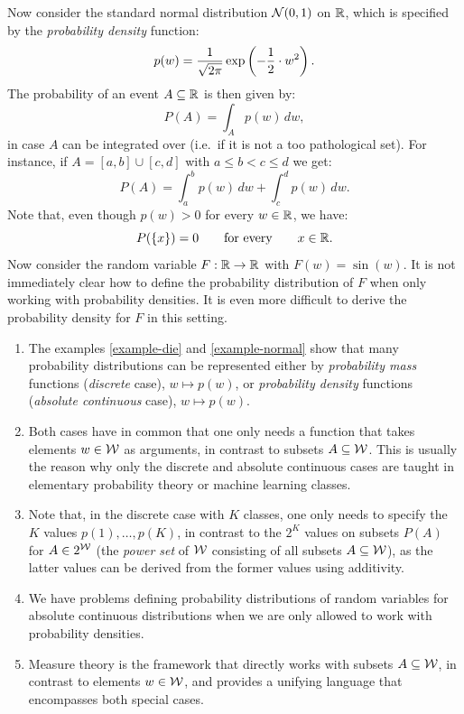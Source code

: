 \begin{Eg}%
    \label{example-normal}
    Now consider the standard normal distribution $\mathcal{N}(0,1)$ on $\mathbb{R}$, which is specified by the \emph{probability density} function:
    \[ p(w) = \frac{1}{\sqrt{2 \pi}} \exp\left ( - \frac{1}{2} \cdot w^2 \right ).   \]
    The probability of an event $A \subseteq \mathbb{R}$ is then given by:
    \[ P(A) = \int_A p(w) \, dw,\]
    in case $A$ can be integrated over (i.e.\ if it is not a too pathological set).
    For instance, if $A= [a,b] \cup [c,d]$ with $a \le b <c\le d$ we get:
    \[P(A) = \int_a^b p(w)\,dw + \int_c^d p(w)\,dw.\]
    Note that, even though $p(w) >0$ for every $w \in \mathbb{R}$, we have:
\[  P(\{x\}) = 0 \qquad \text{for every} \qquad  x \in \mathbb{R}.\]
Now consider the random variable $F: \mathbb{R} \to \mathbb{R}$ with $F(w)=\sin(w)$. 
It is not immediately clear how to define the probability distribution of $F$ when only working with probability densities. It is even more difficult to derive the probability density for $F$ in this setting.
\end{Eg}%

\begin{Disc}%
    \begin{enumerate}
        \item The examples \ref{example-die} and \ref{example-normal} show that many probability distributions can be represented either by \emph{probability mass} functions (\emph{discrete} case), $w \mapsto p(w)$, or \emph{probability density} functions (\emph{absolute continuous} case), $w \mapsto p(w)$.
        \item Both cases have in common that one only needs a function that takes elements $w \in \mathcal{W}$ as arguments, in contrast to subsets $A \subseteq \mathcal{W}$. This is usually the reason why only the discrete and absolute continuous cases are taught in elementary probability theory or machine learning classes.
        \item Note that, in the discrete case with $K$ classes, one only needs to specify the $K$ values $p(1),\dots,p(K)$, in contrast to the $2^K$ values on subsets $P(A)$ for $A \in 2^{\mathcal{W}}$ (the \emph{power set} of $\mathcal{W}$ consisting of all subsets $A \subseteq \mathcal{W}$), as the latter values can be derived from the former values using additivity.
        \item We have problems defining probability distributions of random variables for absolute continuous distributions when we are only allowed to work with probability densities.
        \item Measure theory is the framework that directly works with subsets $A \subseteq \mathcal{W}$, in contrast to elements $w \in \mathcal{W}$, and provides a unifying language that encompasses both special cases.
    \end{enumerate}
\end{Disc}%

